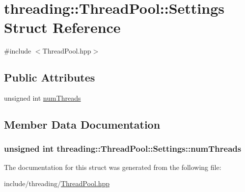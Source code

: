\hypertarget{structthreading_1_1ThreadPool_1_1Settings}{\section{threading\-:\-:Thread\-Pool\-:\-:Settings Struct Reference}
\label{structthreading_1_1ThreadPool_1_1Settings}
}


{\ttfamily \#include $<$Thread\-Pool.\-hpp$>$}

\subsection*{Public Attributes}
\begin{DoxyCompactItemize}
\item 
unsigned int \hyperlink{structthreading_1_1ThreadPool_1_1Settings_abbad3dde82c69b30f74d23974cd782b8}{num\-Threads}
\end{DoxyCompactItemize}


\subsection{Member Data Documentation}
\hypertarget{structthreading_1_1ThreadPool_1_1Settings_abbad3dde82c69b30f74d23974cd782b8}{
\subsubsection[{num\-Threads}]{\setlength{\rightskip}{0pt plus 5cm}unsigned int threading\-::\-Thread\-Pool\-::\-Settings\-::num\-Threads}}\label{structthreading_1_1ThreadPool_1_1Settings_abbad3dde82c69b30f74d23974cd782b8}


The documentation for this struct was generated from the following file\-:\begin{DoxyCompactItemize}
\item 
include/threading/\hyperlink{ThreadPool_8hpp}{Thread\-Pool.\-hpp}\end{DoxyCompactItemize}
